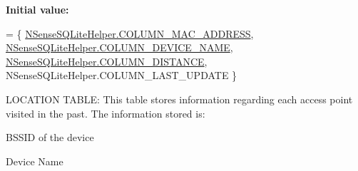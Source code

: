 {\bfseries Initial value\-:}
\begin{DoxyCode}
= \{ 
            \hyperlink{classcs_1_1nsense_1_1db_1_1_n_sense_s_q_lite_helper_ab71ac3b7f6963ff8e77345776010b45a}{NSenseSQLiteHelper.COLUMN\_MAC\_ADDRESS},
            \hyperlink{classcs_1_1nsense_1_1db_1_1_n_sense_s_q_lite_helper_a56f69b02d8da96e6d5657ac6184c05f2}{NSenseSQLiteHelper.COLUMN\_DEVICE\_NAME},
            \hyperlink{classcs_1_1nsense_1_1db_1_1_n_sense_s_q_lite_helper_afbaabae4c4f5eec5518306c84b72b6e0}{NSenseSQLiteHelper.COLUMN\_DISTANCE},
            NSenseSQLiteHelper.COLUMN\_LAST\_UPDATE
    \}
\end{DoxyCode}
L\-O\-C\-A\-T\-I\-O\-N T\-A\-B\-L\-E\-: This table stores information regarding each access point visited in the past. The information stored is\-:
\begin{DoxyItemize}
\item B\-S\-S\-I\-D of the device
\item Device Name
\end{DoxyItemize}

